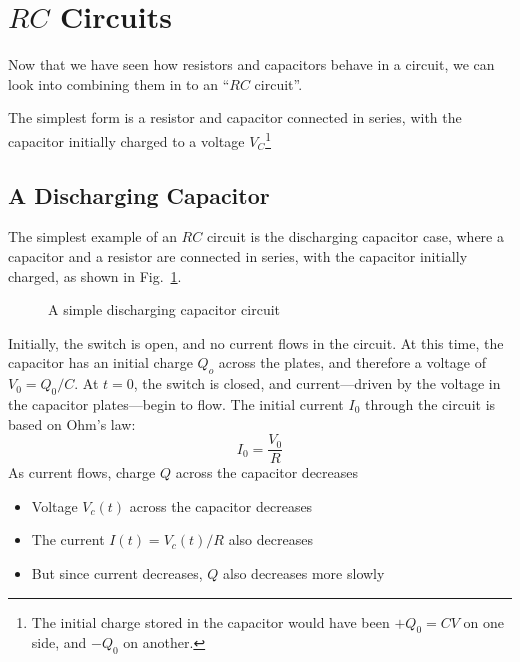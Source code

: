 \section{$RC$ Circuits}

Now that we have seen how resistors and capacitors behave in a circuit, we can
look into combining them in to an ``$RC$ circuit''.

The simplest form is a resistor and capacitor connected in series, with the
capacitor initially charged to a voltage $V_C$\footnote{The initial charge
stored in the capacitor would have been $+Q_0=CV$ on one side, and $-Q_0$ on
another.}
%
%
%
\subsection{A Discharging Capacitor}

The simplest example of an $RC$ circuit is the discharging capacitor case,
where a capacitor and a resistor are connected in series, with the capacitor
initially charged, as shown in Fig.~\ref{fig:discharing-capacitor}.
\begin{figure}[ht]
  \centering
  \caption{A simple discharging capacitor circuit}
  \label{fig:discharing-capacitor}
\end{figure}
Initially, the switch is open, and no current flows in the circuit. At this
time, the capacitor has an initial charge $Q_o$ across the plates, and therefore
a voltage of $V_0=Q_0/C$. At $t=0$, the switch is closed, and current---driven
by the voltage in the capacitor plates---begin to flow. The initial current
$I_0$ through the circuit is based on Ohm's law:
\begin{displaymath}
  I_0=\frac{V_0}R
\end{displaymath}
As current flows, charge $Q$ across the capacitor decreases
\begin{itemize}
\item Voltage $V_c(t)$ across the capacitor decreases
\item The current $I(t)=V_c(t)/R$ also decreases
\item But since current decreases, $Q$ also decreases more
  slowly
\end{itemize}

